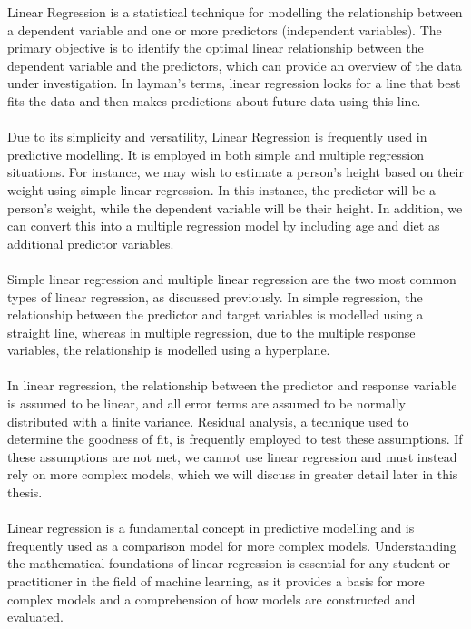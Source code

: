 \documentclass{article}[12pt]
\theoremstyle{definition}
\begin{document}
Linear Regression is a statistical technique for modelling the relationship between a dependent variable and one or more predictors (independent variables). The primary objective is to identify the optimal linear relationship between the dependent variable and the predictors, which can provide an overview of the data under investigation. In layman's terms, linear regression looks for a line that best fits the data and then makes predictions about future data using this line.
\\
\\
Due to its simplicity and versatility, Linear Regression is frequently used in predictive modelling. It is employed in both simple and multiple regression situations. For instance, we may wish to estimate a person's height based on their weight using simple linear regression. In this instance, the predictor will be a person's weight, while the dependent variable will be their height. In addition, we can convert this into a multiple regression model by including age and diet as additional predictor variables.
\\
\\
Simple linear regression and multiple linear regression are the two most common types of linear regression, as discussed previously. In simple regression, the relationship between the predictor and target variables is modelled using a straight line, whereas in multiple regression, due to the multiple response variables, the relationship is modelled using a hyperplane.
\\
\\
In linear regression, the relationship between the predictor and response variable is assumed to be linear, and all error terms are assumed to be normally distributed with a finite variance. Residual analysis, a technique used to determine the goodness of fit, is frequently employed to test these assumptions. If these assumptions are not met, we cannot use linear regression and must instead rely on more complex models, which we will discuss in greater detail later in this thesis. 
\\
\\
Linear regression is a fundamental concept in predictive modelling and is frequently used as a comparison model for more complex models. Understanding the mathematical foundations of linear regression is essential for any student or practitioner in the field of machine learning, as it provides a basis for more complex models and a comprehension of how models are constructed and evaluated.
\end{document}
